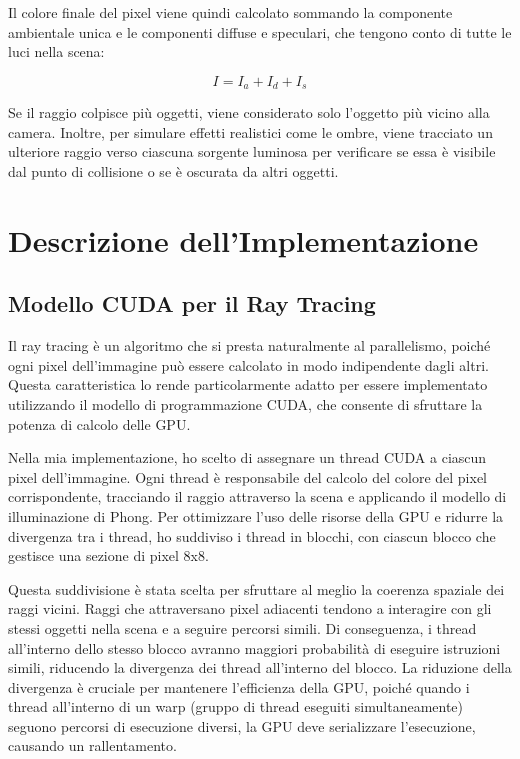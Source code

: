 \documentclass{article}
\begin{document}
Il colore finale del pixel viene quindi calcolato sommando la componente ambientale unica e le componenti diffuse e speculari, che tengono conto di tutte le luci nella scena:

\[ I = I_a + I_d + I_s \]

Se il raggio colpisce più oggetti, viene considerato solo l'oggetto più vicino alla camera. Inoltre, per simulare effetti realistici come le ombre, viene tracciato un ulteriore raggio verso ciascuna sorgente luminosa per verificare se essa è visibile dal punto di collisione o se è oscurata da altri oggetti.

\section{Descrizione dell'Implementazione}

\subsection{Modello CUDA per il Ray Tracing}

Il ray tracing è un algoritmo che si presta naturalmente al parallelismo, poiché ogni pixel dell'immagine può essere calcolato in modo indipendente dagli altri. Questa caratteristica lo rende particolarmente adatto per essere implementato utilizzando il modello di programmazione CUDA, che consente di sfruttare la potenza di calcolo delle GPU.

Nella mia implementazione, ho scelto di assegnare un thread CUDA a ciascun pixel dell'immagine. Ogni thread è responsabile del calcolo del colore del pixel corrispondente, tracciando il raggio attraverso la scena e applicando il modello di illuminazione di Phong. Per ottimizzare l'uso delle risorse della GPU e ridurre la divergenza tra i thread, ho suddiviso i thread in blocchi, con ciascun blocco che gestisce una sezione di pixel 8x8.

Questa suddivisione è stata scelta per sfruttare al meglio la coerenza spaziale dei raggi vicini. Raggi che attraversano pixel adiacenti tendono a interagire con gli stessi oggetti nella scena e a seguire percorsi simili. Di conseguenza, i thread all'interno dello stesso blocco avranno maggiori probabilità di eseguire istruzioni simili, riducendo la divergenza dei thread all'interno del blocco. La riduzione della divergenza è cruciale per mantenere l'efficienza della GPU, poiché quando i thread all'interno di un warp (gruppo di thread eseguiti simultaneamente) seguono percorsi di esecuzione diversi, la GPU deve serializzare l'esecuzione, causando un rallentamento.
\end{document}
